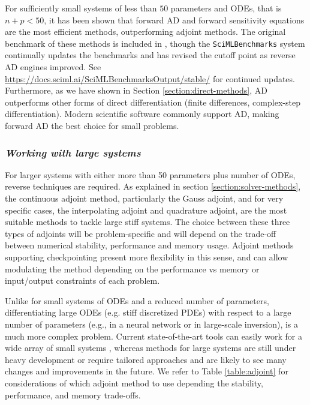 For sufficiently small systems of less than $50$ parameters and ODEs, that is $n + p < 50$, it has been shown that forward AD and forward sensitivity equations are the most efficient methods, outperforming adjoint methods. 
The original benchmark of these methods is included in \cite{ma2021comparison}, though the \texttt{SciMLBenchmarks} system continually updates the benchmarks and has revised the cutoff point as reverse AD engines improved. 
See \url{https://docs.sciml.ai/SciMLBenchmarksOutput/stable/} for continued updates.
Furthermore, as we have shown in Section \ref{section:direct-methods}, AD outperforms other forms of direct differentiation (finite differences, complex-step differentiation). 
Modern scientific software commonly support AD, making forward AD the best choice for small problems. 

\subsubsection*{\textit{Working with large systems}}

For larger systems with either more than 50 parameters plus number of ODEs, reverse techniques are required. 
As explained in section \ref{section:solver-methods}, the continuous adjoint method, particularly the Gauss adjoint, and for very specific cases, the interpolating adjoint and quadrature adjoint, are the most suitable methods to tackle large stiff systems. 
The choice between these three types of adjoints will be problem-specific and will depend on the trade-off between numerical stability, performance and memory usage. 
Adjoint methods supporting checkpointing present more flexibility in this sense, and can allow modulating the method depending on the performance vs memory or input/output constraints of each problem. 

Unlike for small systems of ODEs and a reduced number of parameters, differentiating large ODEs (e.g. stiff discretized PDEs) with respect to a large number of parameters (e.g., in a neural network or in large-scale inversion), is a much more complex problem. 
Current state-of-the-art tools can easily work for a wide array of small systems \cite{rackauckas2020universal}, whereas methods for large systems are still under heavy development or require tailored approaches and are likely to see many changes and improvements in the future.
We refer to Table \ref{table:adjoint} for considerations of which adjoint method to use depending the stability, performance, and memory trade-offs. 

